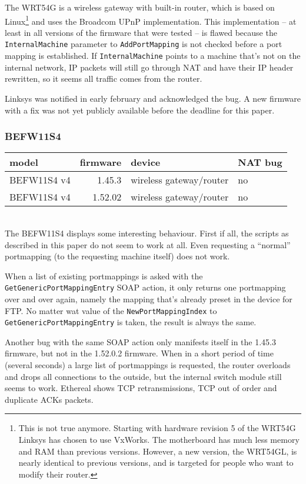\documentclass[10pt]{article}
\begin{document}
The WRT54G is a wireless gateway with built-in router, which is based
on Linux\footnote{This is not true anymore. Starting with hardware revision
5 of the WRT54G Linksys has chosen to use VxWorks. The motherboard has much
less memory and RAM than previous versions. However, a new version, the
WRT54GL, is nearly identical to previous versions, and is targeted for people
who want to modify their router.} and uses the Broadcom UPnP implementation.
This implementation -- at least in all versions of the firmware that were
tested -- is flawed because the \texttt{InternalMachine} parameter to
\texttt{AddPortMapping} is not checked before a port mapping is established. If
\texttt{InternalMachine} points to a machine that's not on the internal network,
IP packets will still go through NAT and have their IP header rewritten, so
it seems all traffic comes from the router.

Linksys was notified in early february and acknowledged the bug. A new
firmware with a fix was not yet publicly available before the deadline for
this paper.

\subsubsection{BEFW11S4}

\begin{tabular}{|l|r|l|l|}
\hline
model & firmware & device & NAT bug \\
\hline
BEFW11S4 v4 & 1.45.3 & wireless gateway/router & no \\
\hline
BEFW11S4 v4 & 1.52.02 & wireless gateway/router & no \\
\hline
\end{tabular} \\

The BEFW11S4 displays some interesting behaviour. First if all, the scripts
as described in this paper do not seem to work at all. Even requesting a
``normal'' portmapping (to the requesting machine itself) does not work.

When a list of existing portmappings is asked with the
\texttt{GetGenericPortMappingEntry} SOAP action, it only returns
one portmapping over and over again, namely the mapping that's already
preset in the device for FTP. No matter wat value of the
\texttt{NewPortMappingIndex} to \texttt{GetGenericPortMappingEntry} is taken,
the result is always the same.

Another bug with the same SOAP action only manifests itself in the 1.45.3
firmware, but not in the 1.52.0.2 firmware. When in a short period of time
(several seconds) a large list of portmappings is requested, the router
overloads and drops all connections to the outside, but the internal switch
module still seems to work. Ethereal shows TCP retransmissions, TCP out of
order and duplicate ACKs packets.
\end{document}
